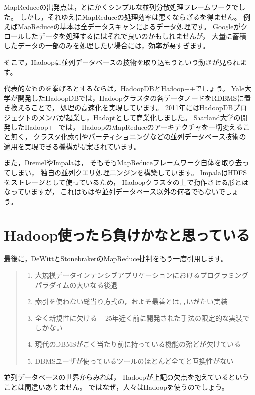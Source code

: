 MapReduceの出発点は，とにかくシンプルな並列分散処理フレームワークでした。
しかし，それゆえにMapReduceの処理効率は悪くならざるを得ません。
例えばMapReduceの基本は全データスキャンによるデータ処理です。
Googleがクロールしたデータを処理するにはそれで良いのかもしれませんが，
大量に蓄積したデータの一部のみを処理したい場合には，効率が悪すぎます。

そこで，Hadoopに並列データベースの技術を取り込もうという動きが見られます。

代表的なものを挙げるとするならば，HadoopDBとHadoop++でしょう。
Yale大学が開発したHadoopDBでは，Hadoopクラスタの各データノードをRDBMSに置き換えることで，
処理の高速化を実現しています。
2011年にはHadoopDBプロジェクトのメンバが起業し，Hadaptとして商業化しました。
Saarland大学の開発したHadoop++では，
HadoopのMapReduceのアーキテクチャを一切変えること無く，
クラスタ化索引やパーティショニングなどの並列データベース技術の適用を実現できる機構が提案されています。

また，DremelやImpalaは，
そもそもMapReduceフレームワーク自体を取り去ってしまい，
独自の並列クエリ処理エンジンを構築しています。
ImpalaはHDFSをストレージとして使っているため，
Hadoopクラスタの上で動作させる形とはなっていますが，
これはもはや並列データベース以外の何者でもないでしょう。

\section{Hadoop使ったら負けかなと思っている}

最後に，DeWittとStonebrakerのMapReduce批判をもう一度引用します。

\begin{quote}
\begin{enumerate}
 \item 大規模データインテンシブアプリケーションにおけるプログラミングパラダイムの大いなる後退
 \item 索引を使わない総当り方式の，およそ最善とは言いがたい実装
 \item 全く新規性に欠ける -- 25年近く前に開発された手法の限定的な実装でしかない
 \item 現代のDBMSがごく当たり前に持っている機能の殆どが欠けている
 \item DBMSユーザが使っているツールのほとんど全てと互換性がない
\end{enumerate}
\end{quote}

並列データベースの世界からみれば，
Hadoopが上記の欠点を抱えているということは間違いありません。
ではなぜ，人々はHadoopを使うのでしょう。

